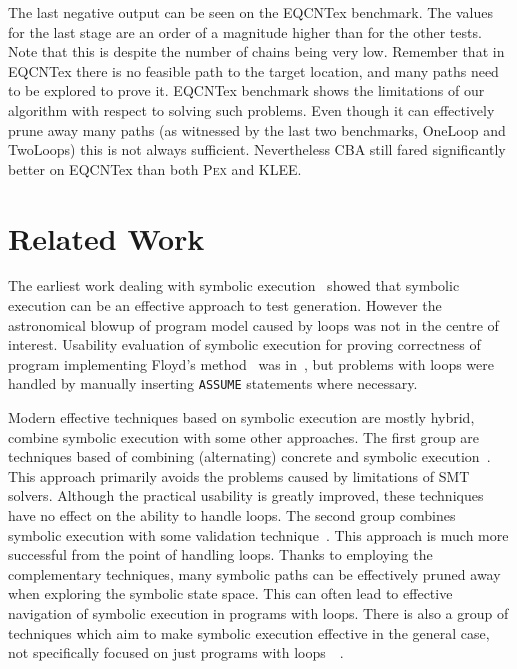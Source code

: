 \documentclass{llncs}
\newcommand{\Pex}{\textsc{Pex}\xspace}
\newcommand{\Klee}{\textsc{KLEE}\xspace}
\newcommand{\CBATool}{\textsc{CBA}\xspace}
\begin{document}
The last negative output can be seen on the EQCNTex benchmark. The
values for the last stage are an order of a magnitude higher than for
the other tests. Note that this is despite the number of chains being very
low. Remember that in EQCNTex there is no feasible path to the target
location, and many paths need to be explored to prove it. EQCNTex
benchmark shows the limitations of our algorithm with respect to solving such
problems. Even though it can effectively prune away many paths (as witnessed
by the last two benchmarks, OneLoop and TwoLoops) this is not always
sufficient. Nevertheless \CBATool still fared significantly better on EQCNTex than both
\Pex and \Klee.


\section{Related Work}
\label{sec:Related}
The earliest work dealing with symbolic execution~\cite{BEL75,Kin76}
showed that symbolic execution can be an effective approach to test
generation. However the astronomical blowup of program model caused by loops
was not in the centre of interest. Usability evaluation of
symbolic execution for proving correctness of program implementing Floyd's
method~\cite{Floyd67} was in~\cite{Kin76}, but
problems with loops were handled by manually inserting \texttt{ASSUME}
statements where necessary.

Modern effective techniques based on symbolic execution are mostly hybrid, combine
symbolic execution with some other approaches. The first group are techniques based of
combining (alternating) concrete and symbolic
execution~\cite{PKS05,SMA05,TdH08,GLM08:fuzzing}. This approach primarily
avoids the problems caused by limitations of SMT solvers. Although the
practical usability is greatly improved, these techniques have no effect on
the ability to handle loops. The second group combines symbolic execution
with some validation
technique~\cite{GNRT10,GMR09,Beckmanetal08,NRTT09,Gulavanietal06}. This
approach is much more successful from the point of handling loops. Thanks to
employing the complementary techniques, many symbolic paths can be effectively
pruned away when exploring the symbolic state space. This can often lead to
effective navigation of symbolic execution in programs with loops.
There is also a group of techniques which aim to make symbolic execution
effective in the general case, not specifically focused on just programs
with loops~~\cite{BCE08,G07,AGT08,Cadar08,CDE08,GLM08:active_props}.
\end{document}
